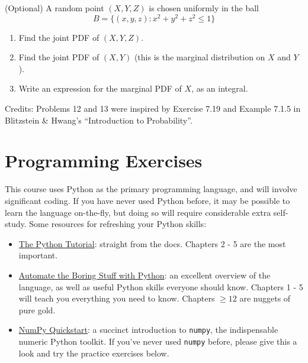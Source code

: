 \documentclass{harvardml}
\theoremstyle{definition}
\theoremstyle{plain}
\begin{document}
\begin{problem}

(Optional) A random point $(X, Y, Z)$ is chosen uniformly in the ball 
$$B = \{(x, y, z): x^2 + y^2 + z^2 \leq 1\}$$

\begin{enumerate} [label=(\alph*)] 
\item Find the joint PDF of $(X, Y, Z)$.
\item Find the joint PDF of  $(X, Y)$ (this is the marginal distribution on $X$ and $Y$).
\item Write an expression for the marginal PDF of $X$, as an integral.

\end{enumerate}
\end{problem}


\noindent Credits:  Problems 12 and 13 were inspired by Exercise 7.19 and  Example 7.1.5 in Blitzstein \& Hwang's ``Introduction to Probability''.

\newpage

\section{Programming Exercises}
This course uses Python as the primary programming language, and will involve
significant coding. If you have never used Python before, it may be possible 
to learn the language on-the-fly, but doing so will require considerable extra 
self-study. Some resources for refreshing your Python skills:

\begin{itemize}
	\item \href{https://docs.python.org/3/tutorial/}{The Python Tutorial}: straight
	from the docs. Chapters 2 - 5 are the most important.
	\item \href{https://automatetheboringstuff.com/}{Automate the Boring Stuff
	with Python}: an excellent overview of the language, as well as useful
	Python skills everyone should know. Chapters 1 - 5 will teach you everything
	you need to know. Chapters $\geq 12$ are nuggets of pure gold.
	\item \href{https://numpy.org/doc/stable/user/quickstart.html}{NumPy Quickstart}:
	a succinct introduction to \verb|numpy|, the indispensable numeric Python toolkit.
	If you've never used \verb|numpy| before, please give this a look and try the 
	practice exercises below.
\end{itemize}
\end{document}
